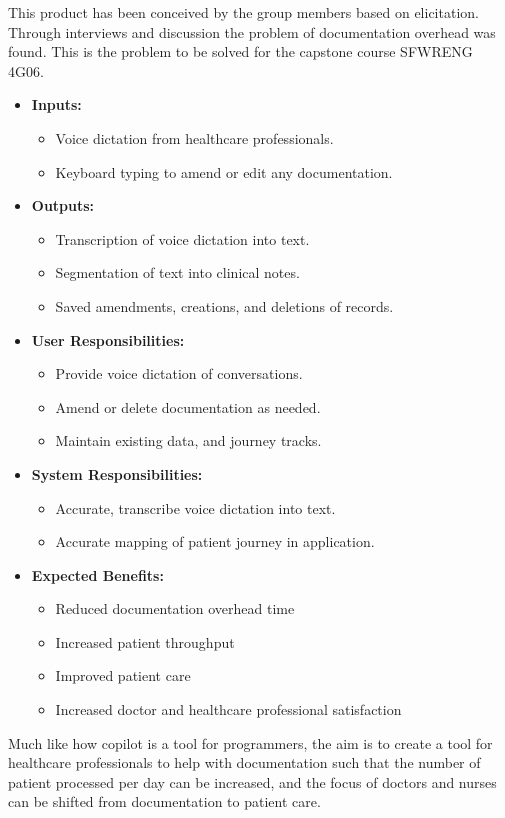 \documentclass[12pt]{article}
\begin{document}
\noindent This product has been conceived by the group members based on elicitation. Through interviews and discussion the problem of documentation overhead was found. This is the problem to be solved for the capstone course SFWRENG 4G06.

\begin{itemize}
  \item \textbf{Inputs:}
  \begin{itemize}
    \item Voice dictation from healthcare professionals.
    \item Keyboard typing to amend or edit any documentation.
  \end{itemize}
  \item \textbf{Outputs:}
  \begin{itemize}
    \item Transcription of voice dictation into text.
    \item Segmentation of text into clinical notes.
    \item Saved amendments, creations, and deletions of records.
  \end{itemize}
  \item \textbf{User Responsibilities:}
  \begin{itemize}
    \item Provide voice dictation of conversations.
    \item Amend or delete documentation as needed.
    \item Maintain existing data, and journey tracks.
  \end{itemize}
  \item \textbf{System Responsibilities:}
  \begin{itemize}
    \item Accurate, transcribe voice dictation into text.
    \item Accurate mapping of patient journey in application.
  \end{itemize}

\item{\textbf{Expected Benefits:}}

\begin{itemize}
  \item Reduced documentation overhead time
  \item Increased patient throughput
  \item Improved patient care
  \item Increased doctor and healthcare professional satisfaction
\end{itemize}
\end{itemize}
Much like how copilot is a tool for programmers, the aim is to create a tool for healthcare professionals to help with documentation such that the number of patient processed per day can be increased, and the focus of doctors and nurses can be shifted from documentation to patient care. 
\end{document}
